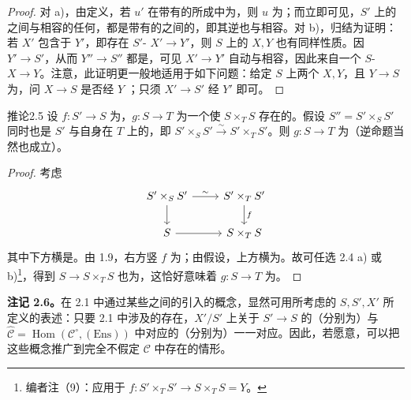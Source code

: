 \begin{proof}
对 a)，由定义，若 $u'$ 在带有的所成中为，则 $u$ 为；而立即可见，$S'$ 上的之间与相容的任何，都是带有的之间的，即其逆也与相容。对 b)，归结为证明：若 $X'$ 包含于 $Y'$，即存在 $S'$- $X'\to Y'$，则 $S$ 上的 $X,Y$ 也有同样性质。因 $Y'\to S'$，从而 $Y''\to S''$ 都是，可见 $X'\to Y'$ 自动与相容，因此来自一个 $S$- $X\to Y$。注意，此证明更一般地适用于如下问题：给定 $S$ 上两个 $X,Y$，且 $Y\to S$ 为，问 $X\to S$ 是否经 $Y$ ；只须 $X'\to S'$ 经 $Y'$ 即可。
\end{proof}
\begin{SGAresult}{推论}{2.5}
设 $f:S'\to S$ 为，$g:S\to T$ 为一个使 $S\times_T S$ 存在的。假设 $S''=S'\times_S S'$ 同时也是 $S'$ 与自身在 $T$ 上的，即 $S'\times_S S'\xrightarrow{\sim}S'\times_T S'$。则 $g:S\to T$ 为（逆命题当然也成立）。
\end{SGAresult}
\begin{proof}
考虑
\[
\begin{tikzcd}S'\times_S S'\arrow[r,"\sim"]\arrow[d]&S'\times_T S'\arrow[d,"f"]\\S\arrow[r]&S\times_T S\end{tikzcd}
\]
其中下方横是。由 1.9，右方竖 $f$ 为；由假设，上方横为。故可任选 2.4 a) 或 b)\footnote{编者注（9）：应用于 $f:S'\times_T S'\to S\times_T S=Y$。}，得到 $S\to S\times_T S$ 也为，这恰好意味着 $g:S\to T$ 为。
\end{proof}
\textbf{注记 2.6。}在 2.1 中通过某些之间的引入的概念，显然可用所考虑的 $S,S',X'$ 所定义的表述：只要 2.1 中涉及的存在，$X'/S'$ 上关于 $S'\to S$ 的（分别为）与 $\widehat{\mathcal C}=\operatorname{Hom}(\mathcal C^\circ,(\mathrm{Ens}))$ 中对应的（分别为）一一对应。因此，若愿意，可以把这些概念推广到完全不假定 $\mathcal C$ 中存在的情形。

